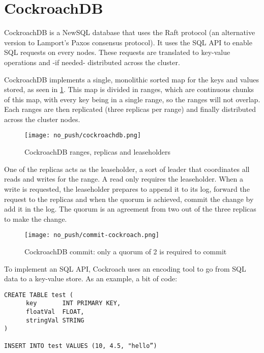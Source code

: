 \section{CockroachDB}
CockroachDB is a NewSQL database that uses the Raft protocol (an alternative version to Lamport's Paxos consensus protocol).
It uses the SQL API to enable SQL requests on every nodes. These requests are translated to key-value operations and -if needed- distributed across the cluster.

CockroachDB implements a single, monolithic sorted map for the keys and values stored, as seen in \ref{fig:cockroachdb}. This map is divided in ranges, which are continuous chunks of this map, with every key being in a single range, so the ranges will not overlap. Each ranges are then replicated (three replicas per range) and finally distributed across the cluster nodes.\cite{CRDB:automatedoperations}

\begin{figure}[H]
  \vspace{-10pt}
  \centering
  \centerline{\texttt{[image: no\_push/cockroachdb.png]}}
  \vspace{-5pt}
  \caption{CockroachDB ranges, replicas and leaseholders}
  \vspace{-5pt}
  \label{fig:cockroachdb}
\end{figure}

One of the replicas acts as the leaseholder, a sort of leader that coordinates all reads and writes for the range. A read only requires the leaseholder.
When a write is requested, the leaseholder prepares to append it to its log, forward the request to the replicas and when the quorum is achieved, commit the change by add it in the log. The quorum is an agreement from two out of the three replicas to make the change.

\begin{figure}[H]
  \vspace{-10pt}
  \centering
  \centerline{\texttt{[image: no\_push/commit-cockroach.png]}}
  \vspace{-5pt}
  \caption{CockroachDB commit: only a quorum of 2 is required to commit }
  \vspace{-5pt}
  \label{fig:cockroachdb-commit}
\end{figure}

To implement an SQL API, Cockroach uses an encoding tool to go from SQL data to a key-value store\cite{CRDB:mapKV}. As an example, a bit of code:
\begin{verbatim}
CREATE TABLE test (
      key       INT PRIMARY KEY,
      floatVal  FLOAT,
      stringVal STRING
)

INSERT INTO test VALUES (10, 4.5, "hello”)
\end{verbatim}

